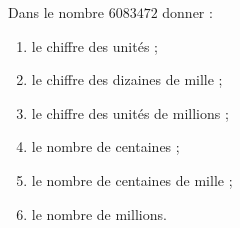\begin{exercice}{}{}
    Dans le nombre $\num{6083472}$ donner :
    \begin{enumerate}
       \item le chiffre des unités ;
       \item le chiffre des dizaines de mille ;
       \item le chiffre des unités de millions ;
       \item le nombre de centaines ;
       \item le nombre de centaines de mille ;
       \item le nombre de millions.
    \end{enumerate}
 \end{exercice}